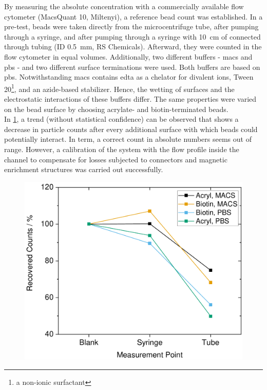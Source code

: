By measuring the absolute concentration with a commercially available flow cytometer (MacsQuant 10, Miltenyi), a reference bead count was established. In a pre-test, beads were taken directly from the microcentrifuge tube, after pumping through a syringe, and after pumping through a syringe with \SI{10}{\centi\meter} of connected through tubing (ID \SI{0.5}{\milli\meter}, RS Chemicals). Afterward, they were counted in the flow cytometer in equal volumes. Additionally, two different buffers - \gls{macs} and \gls{pbs} - and two different surface terminations were used. Both buffers are based on \acrfull{pbs}. Notwithstanding \gls{macs} contains \gls{edta} as a chelator for divalent ions, Tween 20\footnote{a non-ionic surfactant}, and an azide-based stabilizer. Hence, the wetting of surfaces and the electrostatic interactions of these buffers differ. The same properties were varied on the bead surface by choosing acrylate- and biotin-terminated beads.\\
In \cref{fig:conc:losses_syringe}, a trend (without statistical confidence) can be observed that shows a decrease in particle counts after every additional surface with which beads could potentially interact. In term, a correct count in absolute numbers seems out of range. However, a calibration of the system with the flow profile inside the channel to compensate for losses subjected to connectors and magnetic enrichment structures was carried out successfully.
\begin{figure}[b]
	\centering
	\includegraphics[width=.7\linewidth]{Ressources/Concentration/Losses-Syringe-Tubing}
	\label{fig:conc:losses_syringe}
\end{figure}


